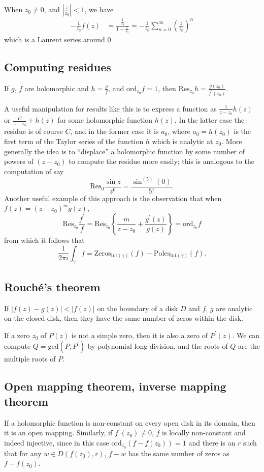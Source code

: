 \documentclass{article}
\newcommand{\ord}{\mathrm{ord}}
\newcommand{\Res}{\mathrm{Res}}
\begin{document}
When $z_0 \neq 0$, and $\left| \frac{z}{z_0} \right| < 1$,
we have
\begin{align*}
   -\frac{1}{z_0} f(z)
&=  \frac{\frac{1}{z_0}}
         {1 - \frac{z}{z_0}}
 = -\frac{1}{z_0}
    \sum_{n=0}^\infty
      \left(\frac{z}{z_0}\right)^n
\end{align*}
which is a Laurent series around 0.

\subsection{Computing residues}

If $g$, $f$ are holomorphic and
$h = \frac{g}{f}$, and $\ord_{z_0} f = 1$, then
$\Res_{z_0} h = \frac{g(z_0)}{f^\prime(z_0)}$.

A useful manipulation for results like this is to express
a function as $\frac{1}{z - z_0} h(z)$ or
$\frac{C}{z - z_0} + h(z)$ for some holomorphic function
$h(z)$. In the latter case the residue is of course $C$, and in the
former case it is $a_0$, where $a_0 = h(z_0)$ is the first term of the
Taylor series of the function $h$ which is analytic at $z_0$. More
generally the idea is to ``displace'' a holomorphic function by some
number of powers of $(z - z_0)$ to compute the residue more easily;
this is analogous to the computation of say
$$
  \Res_0 \frac{\sin z}{z^6}
= \frac{\sin^{(5)}(0)}{5!}.
$$
Another useful example of this approach is the observation that when
$f(z) = (z - z_0)^m g(z)$,
$$
  \Res_{z_0} \frac{f^\prime}{f}
= \Res_{z_0}
  \left\{
    \frac{m}{z - z_0} + \frac{g^\prime(z)}{g(z)}
  \right\}
= \ord_{z_0} f
$$
from which it follows that
$$
  \frac{1}{2 \pi i}
  \int_\gamma f
= \mathrm{Zeros}_{\mathrm{Int}(\gamma)}(f)
- \mathrm{Poles}_{\mathrm{Int}(\gamma)}(f).
$$

\subsection{Rouch\'e's theorem}
If $|f(z) - g(z)| < |f(z)|$ on the boundary of a disk
$D$ and $f$, $g$ are analytic on the closed disk, then they have the
same number of zeros within the disk.

If a zero $z_0$ of $P(z)$ is not a simple zero, then it is also a zero
of $P^\prime(z)$. We can compute $Q = \mathrm{gcd}(P, P^\prime)$ by
polynomial long division, and the roots of $Q$ are the multiple roots
of $P$.

\subsection{Open mapping theorem, inverse mapping theorem}
If a holomorphic function is non-constant on every open disk in its
domain, then it is an open mapping. Similarly, if $f^\prime(z_0) \neq
0$, $f$ is locally non-constant and indeed injective, since in this
case $\ord_{z_0} (f - f(z_0)) = 1$ and there is an
$r$ such that for any $w \in D(f(z_0), r)$, $f - w$ has the same
number of zeros as $f - f(z_0)$.
\end{document}
